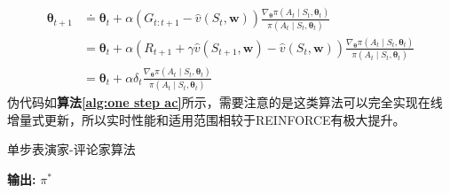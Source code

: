 \begin{equation}
    \begin{aligned}
\boldsymbol{\theta}_{t+1} & \doteq \boldsymbol{\theta}_{t}+\alpha\left(G_{t: t+1}-\hat{v}\left(S_{t}, \mathbf{w}\right)\right) \frac{\nabla_{\boldsymbol{\theta}} \pi\left(A_{t} \mid S_{t}, \boldsymbol{\theta}_{t}\right)}{\pi\left(A_{t} \mid S_{t}, \boldsymbol{\theta}_{t}\right)} \\
&=\boldsymbol{\theta}_{t}+\alpha\left(R_{t+1}+\gamma \hat{v}\left(S_{t+1}, \mathbf{w}\right)-\hat{v}\left(S_{t}, \mathbf{w}\right)\right) \frac{\nabla_{\boldsymbol{\theta}} \pi\left(A_{t} \mid S_{t}, \boldsymbol{\theta}_{t}\right)}{\pi\left(A_{t} \mid S_{t}, \boldsymbol{\theta}_{t}\right)} \\
&=\boldsymbol{\theta}_{t}+\alpha \delta_{t} \frac{\nabla_{\boldsymbol{\theta}} \pi\left(A_{t} \mid S_{t}, \boldsymbol{\theta}_{t}\right)}{\pi\left(A_{t} \mid S_{t}, \boldsymbol{\theta}_{t}\right)}
\end{aligned}
\end{equation}
伪代码如\textbf{算法\ref{alg:one step ac}}所示，需要注意的是这类算法可以完全实现在线增量式更新，所以实时性能和适用范围相较于REINFORCE有极大提升。

\begin{algorithm}[h]
	\caption{单步表演家-评论家算法}
	\label{alg:one step ac}
	\begin{algorithmic}[1]
		\ENDFOR
		\ENDWHILE
	\end{algorithmic}
	\hspace*{0.02in} {\bf 输出:} $\pi^{*}$
\end{algorithm}

